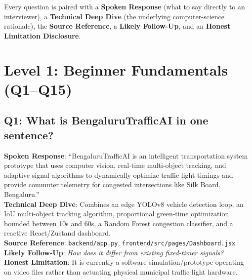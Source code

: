 \documentclass[11pt,a4paper,oneside]{report}
\begin{document}
Every question is paired with a \textbf{Spoken Response} (what to say directly to an interviewer), a \textbf{Technical Deep Dive} (the underlying computer-science rationale), the \textbf{Source Reference}, a \textbf{Likely Follow-Up}, and an \textbf{Honest Limitation Disclosure}.

\section{Level 1: Beginner Fundamentals (Q1--Q15)}

\subsection*{Q1: What is BengaluruTrafficAI in one sentence?}
\begin{interviewbox}
\textbf{Spoken Response}: ``BengaluruTrafficAI is an intelligent transportation system prototype that uses computer vision, real-time multi-object tracking, and adaptive signal algorithms to dynamically optimize traffic light timings and provide commuter telemetry for congested intersections like Silk Board, Bengaluru.''\\
\textbf{Technical Deep Dive}: Combines an edge YOLOv8 vehicle detection loop, an IoU multi-object tracking algorithm, proportional green-time optimization bounded between 10s and 60s, a Random Forest congestion classifier, and a reactive React/Zustand dashboard.\\
\textbf{Source Reference}: \texttt{backend/app.py}, \texttt{frontend/src/pages/Dashboard.jsx}\\
\textbf{Likely Follow-Up}: \textit{How does it differ from existing fixed-timer signals?}\\
\textbf{Honest Limitation}: It is currently a software simulation/prototype operating on video files rather than actuating physical municipal traffic light hardware.
\end{interviewbox}
\end{document}
